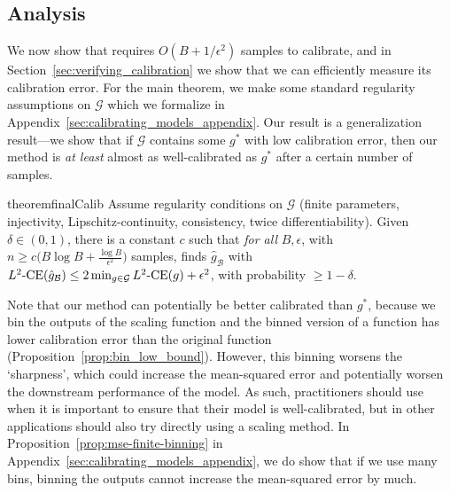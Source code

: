 

\subsection{Analysis}

We now show that \ourcal{} requires $O(B + 1/\epsilon^2)$ samples to calibrate, and in Section~\ref{sec:verifying_calibration} we show that we can efficiently measure its calibration error. For the main theorem, we make some standard regularity assumptions on $\mathcal{G}$ which we formalize in Appendix~\ref{sec:calibrating_models_appendix}. Our result is a generalization result---we show that if $\mathcal{G}$ contains some $g^*$ with low calibration error, then our method is \emph{at least} almost as well-calibrated as $g^*$ after a certain number of samples.

\begin{restatable}{theorem}{finalCalib}
\label{thm:final-calib}
Assume regularity conditions on $\mathcal{G}$ (finite parameters, injectivity, Lipschitz-continuity, consistency, twice differentiability). Given $\delta \in (0, 1)$, there is a constant $c$ such that \emph{for all} $B, \epsilon$, with $n \geq c \Big(B\log{B} + \frac{\log{B}}{\epsilon^2}\Big)$ samples, \ourcal{} finds $\hat{g}_{\mathcal{B}}$ with $L^2\mbox{-CE}(\hat{g}_{\mathcal{B}}) \leq 2\min_{g \in \mathcal{G}}L^2\mbox{-CE}(g) + \epsilon^2$, with probability $\geq 1 - \delta$.
\end{restatable}

Note that our method can potentially be better calibrated than $g^*$, because we bin the outputs of the scaling function and the binned version of a function has lower calibration error than the original function (Proposition~\ref{prop:bin_low_bound}). However, this binning worsens the `sharpness', which could increase the mean-squared error and potentially worsen the downstream performance of the model. As such, practitioners should use \ourcal{} when it is important to ensure that their model is well-calibrated, but in other applications should also try directly using a scaling method. In Proposition~\ref{prop:mse-finite-binning} in Appendix~\ref{sec:calibrating_models_appendix}, we do show that if we use many bins, binning the outputs cannot increase the mean-squared error by much.

